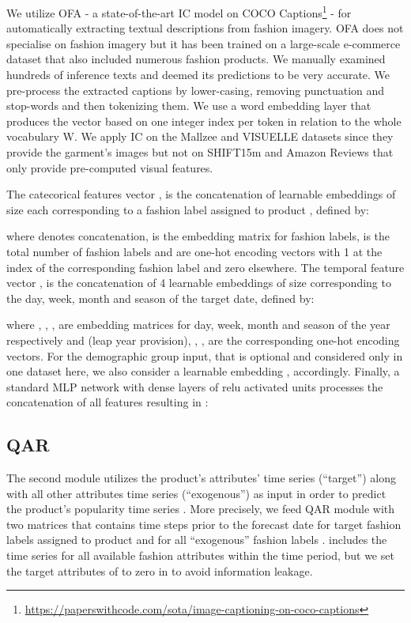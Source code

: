 \documentclass{article}
\begin{document}
We utilize OFA \cite{wang2022unifying} - a state-of-the-art IC model on COCO Captions\footnote{\url{https://paperswithcode.com/sota/image-captioning-on-coco-captions}} - for automatically extracting textual descriptions from fashion imagery. OFA does not specialise on fashion imagery but it has been trained on a large-scale e-commerce dataset that also included numerous fashion products. We manually examined hundreds of inference texts and deemed its predictions to be very accurate. 
We pre-process the extracted captions by lower-casing, removing punctuation and stop-words and then tokenizing them. 
We use a word embedding layer that produces the  vector based on one integer index per token in relation to the whole vocabulary W.
We apply IC on the Mallzee and VISUELLE datasets since they provide the garment's images but not on SHIFT15m and Amazon Reviews that only provide pre-computed visual features.

The catecorical features vector , is the concatenation of  learnable embeddings of size  each corresponding to a fashion label assigned to product , defined by:

where  denotes concatenation,  is the embedding matrix for fashion labels,  is the total number of fashion labels and  are one-hot encoding vectors with 1 at the index of the corresponding fashion label and zero elsewhere. The temporal feature vector , is the concatenation of 4 learnable embeddings of size  corresponding to the day, week, month and season of the target date, defined by:

where , , ,  are embedding matrices for day, week, month and season of the year respectively and  (leap year provision), , ,  are the corresponding one-hot encoding vectors. For the demographic group input, that is optional and considered only in one dataset here, we also consider a learnable embedding , accordingly. Finally, a standard MLP network with  dense layers of  relu activated units processes the concatenation of all features resulting in :


\subsection{QAR}
The second module utilizes the product’s attributes' time series (``target'')  along with all other attributes time series (``exogenous'')  as input in order to predict the product's popularity time series . 
More precisely, we feed QAR module with two matrices  
that contains  time steps prior to the forecast date for  target fashion labels assigned to product  and  for all ``exogenous'' fashion labels . 
 includes the time series for all available fashion attributes within the time period, but we set the target attributes of  to zero in  to avoid information leakage.
\end{document}
